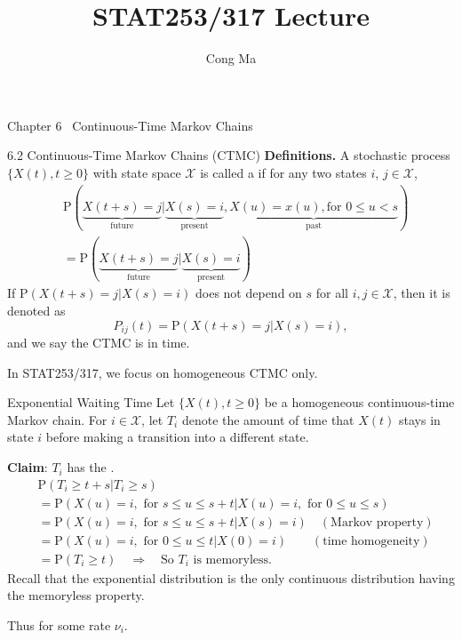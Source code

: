 \documentclass[letterpaper,handout, mathserif]{beamer}
\title{STAT253/317 Lecture \chapnum} \date{} \author{Cong Ma}
\def\p{\mathrm P}
\def\X{\mathcal{X}}
\begin{document}
\begin{frame}\maketitle\begin{center}Chapter 6 \ Continuous-Time Markov Chains\end{center}\end{frame}
\begin{frame}{6.2 Continuous-Time Markov Chains (CTMC)}
\textbf{Definitions.} A stochastic process $\{X(t),t\ge 0\}$ with state space $\X$ is called a  if for any two states $i$, $j\in\X$,
\begin{align*}
&\p(\underbrace{X(t+s)=j}_{\mbox{future}}|\underbrace{X(s)=i}_{\mbox{present}},\underbrace{X(u)=x(u),\mbox{for }0\le u<s}_{\mbox{past}})\\
&=\p(\underbrace{X(t+s)=j}_{\mbox{future}}|\underbrace{X(s)=i}_{\mbox{present}})
\end{align*}
If $\p(X(t+s)=j|X(s)=i)$ does not depend on $s$ for all $i,j\in\X$, then it is denoted as
$$P_{ij}(t)=\p(X(t+s)=j|X(s)=i),$$
and we say the CTMC is  in time.\medskip

In STAT253/317, we focus on homogeneous CTMC only.
\end{frame}
\begin{frame}{Exponential Waiting Time}
Let $\{X(t),t\ge 0\}$ be a homogeneous continuous-time Markov chain.
For $i\in\X$, let $T_i$ denote the amount of time that $X(t)$ stays in state $i$ before making a transition into
a different state. \medskip

{\bf Claim}: $T_i$ has the .
\begin{align*}
&\p(T_i\ge t+s|T_i\ge s)\\
&=\p(X(u)=i,\mbox{ for } s\le u\le s+t|X(u)=i,\mbox{ for } 0\le u\le s)\\
&=\p(X(u)=i,\mbox{ for } s\le u\le s+t|X(s)=i)\quad(\mbox{Markov property})\\
&=\p(X(u)=i,\mbox{ for } 0\le u\le t|X(0)=i)\qquad(\mbox{time homogeneity})\\
&=\p(T_i\ge t) \quad\Rightarrow\quad  \mbox{So $T_i$ is memoryless.}
\end{align*}
Recall that the exponential distribution is the only continuous distribution having the memoryless property.

Thus  for some rate $\nu_i$.
\end{frame}
\end{document}
